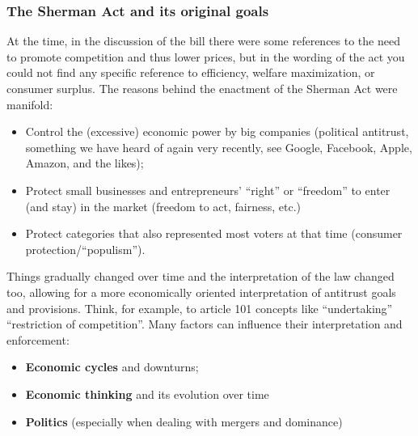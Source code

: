         \subsubsection{The Sherman Act and its original goals}
            At the time, in the discussion of the bill there were some references to the need to promote competition and thus lower prices, but in the wording of the act you could not find any specific reference to efficiency, welfare maximization, or consumer surplus. 
            The reasons behind the enactment of the Sherman Act were manifold:  
            \begin{itemize}
                \item Control the (excessive) economic power by big companies (political antitrust, something we have heard of again very recently, see Google, Facebook, Apple, Amazon, and the likes);
                \item Protect small businesses and entrepreneurs’ “right” or “freedom” to enter (and stay) in the market (freedom to act, fairness, etc.) 
                \item Protect categories that also represented most voters at that time (consumer protection/“populism”).  
            \end{itemize}

            Things gradually changed over time and the interpretation of the law changed too, allowing for a more economically oriented interpretation of antitrust goals and provisions. Think, for example, to article 101 concepts like “undertaking” “restriction of competition”.
            Many factors can influence their interpretation and enforcement:
            \begin{itemize}
                \item \textbf{Economic cycles} and downturns;
                \item \textbf{Economic thinking} and its evolution over time
                \item \textbf{Politics} (especially when dealing with mergers and dominance)
            \end{itemize}

            
